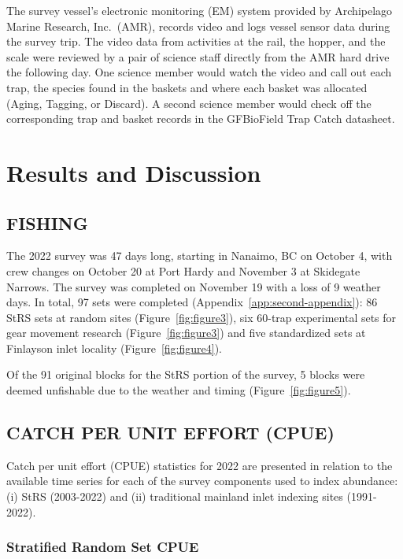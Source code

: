 \documentclass[12pt]{article}\usepackage[]{graphicx}\usepackage[]{color}
\begin{document}
The survey vessel's electronic monitoring (EM) system provided by Archipelago Marine Research, Inc.~(AMR), records video and logs vessel sensor data during the survey trip. The video data from activities at the rail, the hopper, and the scale were reviewed by a pair of science staff directly from the AMR hard drive the following day. One science member would watch the video and call out each trap, the species found in the baskets and where each basket was allocated (Aging, Tagging, or Discard). A second science member would check off the corresponding trap and basket records in the GFBioField Trap Catch datasheet.

\hypertarget{results-and-discussion}{%
\section{Results and Discussion}\label{results-and-discussion}}

\hypertarget{fishing}{%
\subsection{FISHING}\label{fishing}}

The 2022 survey was 47 days long, starting in Nanaimo, BC on October 4, with crew changes on October 20 at Port Hardy and November 3 at Skidegate Narrows. The survey was completed on November 19 with a loss of 9 weather days. In total, 97 sets were completed (Appendix~\ref{app:second-appendix}): 86 StRS sets at random sites (Figure~\ref{fig:figure3}), six 60-trap experimental sets for gear movement research (Figure~\ref{fig:figure3}) and five standardized sets at Finlayson inlet locality (Figure~\ref{fig:figure4}).

Of the 91 original blocks for the StRS portion of the survey, 5 blocks were deemed unfishable due to the weather and timing (Figure~\ref{fig:figure5}).

\hypertarget{catch-per-unit-effort-cpue}{%
\subsection{CATCH PER UNIT EFFORT (CPUE)}\label{catch-per-unit-effort-cpue}}

Catch per unit effort (CPUE) statistics for 2022 are presented in relation to the available time series for each of the survey components used to index abundance: (i) StRS (2003-2022) and (ii) traditional mainland inlet indexing sites (1991-2022).

\hypertarget{stratified-random-set-cpue}{%
\subsubsection{Stratified Random Set CPUE}\label{stratified-random-set-cpue}}
\end{document}
